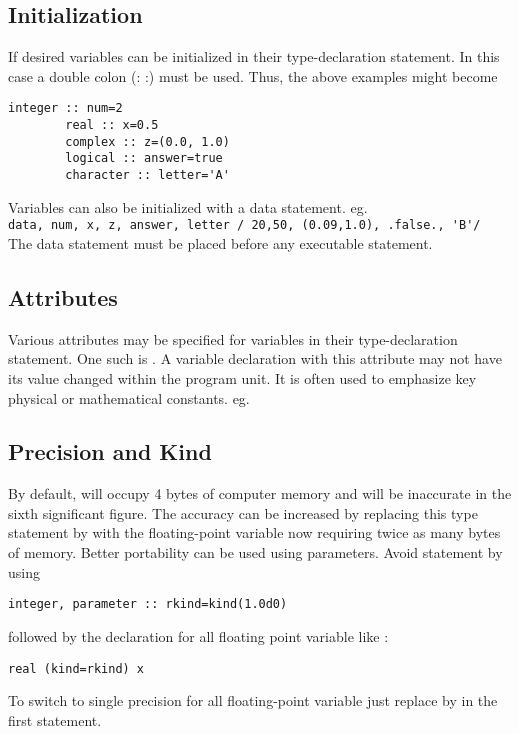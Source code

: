 \documentclass[class=book,crop=false]{standalone}
\begin{document}
    \subsection{Initialization}
    If desired variables can be initialized in their type-declaration statement.
    In this case a double colon (: :) must be used.
    Thus, the above examples might become
    \begin{lstlisting}[numbers=none]
        integer :: num=2
        real :: x=0.5
        complex :: z=(0.0, 1.0)
        logical :: answer=true
        character :: letter='A'
    \end{lstlisting}
    Variables can also be initialized with a data statement. eg.\\ \lstinline[basicstyle=\ttfamily]{data, num, x, z, answer, letter / 20,50, (0.09,1.0), .false., 'B'/}\\
    The data statement must be placed before any executable statement.
    \subsection{Attributes}
    Various attributes may be specified for variables in their type-declaration statement. 
    One such is .
    A variable declaration with this attribute may not have its value changed within the program unit. 
    It is often used to emphasize key physical or mathematical constants. eg. 
    \subsection{Precision and Kind}
    By default,  will occupy 4 bytes of computer memory and will be inaccurate in the sixth significant figure. 
    The accuracy can be increased by replacing this type statement by  with the floating-point variable now requiring twice as many bytes of memory. Better portability can be used using  parameters. Avoid  statement by using 
    \begin{lstlisting}[numbers=none]
        integer, parameter :: rkind=kind(1.0d0)
    \end{lstlisting}
    followed by the declaration for all floating point variable like :
    \begin{lstlisting}[numbers=none]
        real (kind=rkind) x
    \end{lstlisting}
    To switch to single precision for all floating-point variable just replace  by  in the first statement.\\
\end{document}
